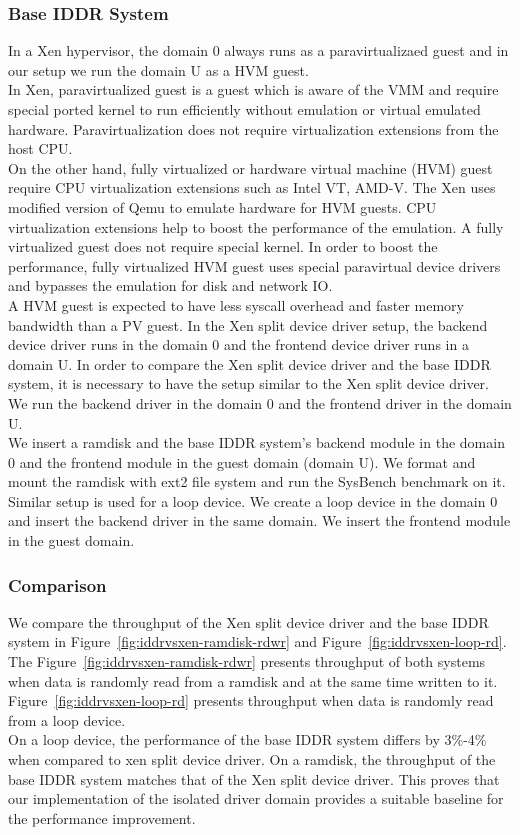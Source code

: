 \subsubsection*{Base IDDR System}
In a Xen hypervisor, the domain 0 always runs as a paravirtualizaed guest and in our setup we run the domain U as a HVM guest.
\\[3mm] 
In Xen, paravirtualized guest is a guest which is aware of the VMM and require special ported kernel to run efficiently without emulation or virtual emulated hardware. Paravirtualization does not require virtualization extensions from the host CPU. 
\\[3mm]
On the other hand, fully virtualized or hardware virtual machine (HVM) guest require CPU virtualization extensions such as Intel VT, AMD-V. The Xen uses modified version of Qemu to emulate hardware for HVM guests. CPU virtualization extensions help to boost the performance of the emulation. A fully virtualized guest does not require special kernel. In order to boost the performance, fully virtualized HVM guest uses special paravirtual device drivers and bypasses the emulation for disk and network IO.
\\[3mm]
A HVM guest is expected to have less syscall overhead and faster memory bandwidth than a PV guest. In the Xen split device driver setup, the backend device driver runs in the domain 0 and the frontend device driver runs in a domain U. In order to compare the Xen split device driver and the base IDDR system, it is necessary to have the setup similar to the Xen split device driver. We run the backend driver in the domain 0 and the frontend driver in the domain U.
\\[3mm]
We insert a ramdisk and the base IDDR system's backend module in the domain 0 and the frontend module in the guest domain (domain U). We format and mount the ramdisk with ext2 file system and run the SysBench benchmark on it.  
\\[3mm]
Similar setup is used for a loop device. We create a loop device in the domain 0 and insert the backend driver in the same domain. We insert the frontend module in the guest domain.

\subsubsection*{Comparison}
We compare the throughput of the Xen split device driver and the base IDDR system in Figure~\ref{fig:iddrvsxen-ramdisk-rdwr} and Figure~\ref{fig:iddrvsxen-loop-rd}. The Figure~\ref{fig:iddrvsxen-ramdisk-rdwr} presents throughput of both systems when data is randomly read from a ramdisk and at the same time written to it. Figure~\ref{fig:iddrvsxen-loop-rd} presents throughput when data is randomly read from a loop device. 
\\[3mm]
On a loop device, the performance of the base IDDR system differs by 3\%-4\% when compared to xen split device driver. On a ramdisk, the throughput of the base IDDR system matches that of the Xen split device driver. This proves that our implementation of the isolated driver domain provides a suitable baseline for the performance improvement.

